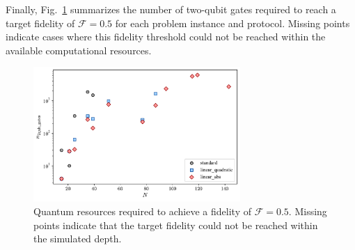 Finally, Fig.~\ref{fig:summary_plot} summarizes the number of two-qubit gates required to reach a target fidelity of $\mathcal{F} = 0.5$ for each problem instance and protocol. Missing points indicate cases where this fidelity threshold could not be reached within the available computational resources.  

\begin{figure}[h]
    \centering
    \includegraphics[width=0.7\textwidth]{04-results/figs/summary_plot.pdf}
    \caption{Quantum resources required to achieve a fidelity of $\mathcal{F} = 0.5$. Missing points indicate that the target fidelity could not be reached within the simulated depth.}
    \label{fig:summary_plot}
\end{figure}